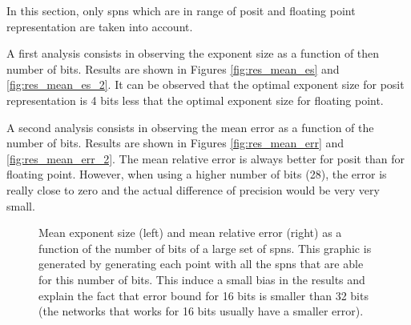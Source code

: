 In this section, only \glspl{spn} which are in range of posit and floating point representation are taken into account.

A first analysis consists in observing the exponent size as a function of then number of bits. Results are shown in Figures \ref{fig:res_mean_es} and \ref{fig:res_mean_es_2}. It can be observed that the optimal exponent size for posit representation is 4 bits less that the optimal exponent size for floating point.

A second analysis consists in observing the mean error as a function of the number of bits. Results are shown in Figures \ref{fig:res_mean_err} and \ref{fig:res_mean_err_2}. The mean relative error is always better for posit than for floating point. However, when using a higher number of bits (28), the error is really close to zero and the actual difference of precision would be very very small.


\begin{figure}[!ht]
\begin{mdframed}
\centering
{}
\caption{Mean exponent size (left) and mean relative error (right) as a function of the number of bits of a large set of \glspl{spn}. This graphic is generated by generating each point with all the \glspl{spn} that are able for this number of bits. This induce a small bias in the results and explain the fact that error bound for 16 bits is smaller than 32 bits (the networks that works for 16 bits usually have a smaller error).}
\label{fig:res_mean}
\end{mdframed}
\end{figure}


